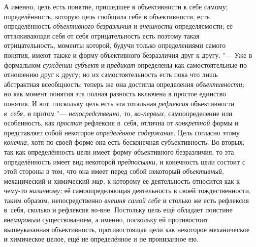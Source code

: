 А именно, цель есть понятие, пришедшее в объективности к себе
самому; определённость, которую цель сообщила себе в объективности, есть
определённость {\em объективного безразличия} и {\em внешности}
определяемости; её отталкивающая себя от себя отрицательность
есть поэтому такая отрицательность, моменты которой, будучи только
определениями самого понятия, имеют также и форму объективного безразличия
друг к другу. "--- Уже в формальном
{\em суждении субъект} и {\em предикат} определены
как самостоятельные по отношению друг к другу; но их самостоятельность есть
пока что лишь абстрактная всеобщность; теперь же она достигла определения
{\em объективности;} но
как момент понятия эта полная разность включена в простое единство понятия.
И вот, поскольку цель есть эта тотальная {\em рефлексия}
объективности {\em в~себя,} и притом "--- {\em непосредственно,}
то, {\em во-первых,} самоопределение или особенность, как
{\em простая} рефлексия в~себя, отлична от {\em конкретной}
формы и представляет собой некоторое {\em определённое содержание}.
Цель согласно этому {\em конечна,} хотя по
своей форме она есть бесконечная субъективность. Во-вторых, так как
определённость цели имеет форму объективного безразличия, то эта
определённость имеет вид некоторой {\em предпосылки,} и
конечность цели состоит с этой стороны в том, что она имеет перед собой
некоторый {\em объективный,} механический и химический {\em мир,}
к которому её деятельность относится как к чему-то {\em наличному;} её
самоопределяющая деятельность в своей тождественности, таким образом,
непосредственно {\em внешня самой себе}
и столько же есть рефлексия в~себя, сколько и рефлексия
во-вне. Постольку цель ещё обладает поистине {\em внемировым}
существованием, а именно, поскольку ей противостоит вышеуказанная
объективность, противостоящая цели как некоторое механическое и химическое
целое, ещё не определённое и не пронизанное ею.

